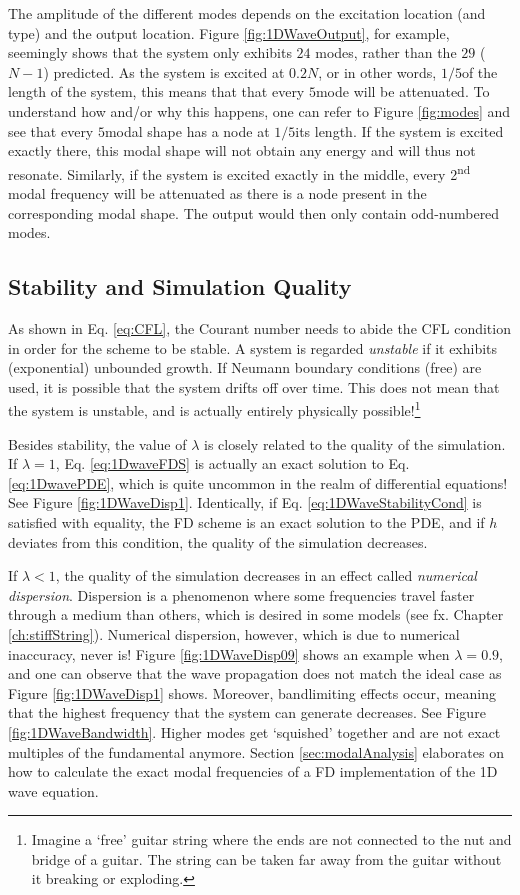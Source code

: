 The amplitude of the different modes depends on the excitation location (and type) and the output location. 
Figure \ref{fig:1DWaveOutput}, for example, seemingly shows that the system only exhibits $24$ modes, rather than the $29$ ($N-1$) predicted. As the system is excited at $0.2N$, or in other words, $1/5$\th of the length of the system, this means that that every $5$\th mode will be attenuated.
To understand how and/or why this happens, one can refer to Figure \ref{fig:modes} and see that every $5$\th modal shape has a node at $1/5$\th its length. If the system is excited exactly there, this modal shape will not obtain any energy and will thus not resonate. Similarly, if the system is excited exactly in the middle, every 2\textsuperscript{nd} modal frequency will be attenuated as there is a node present in the corresponding modal shape. The output would then only contain odd-numbered modes. 

\subsection{Stability and Simulation Quality}\label{sec:quality1DWave}
As shown in Eq. \eqref{eq:CFL}, the Courant number needs to abide the CFL condition in order for the scheme to be stable. A system is regarded \textit{unstable} if it exhibits (exponential) unbounded growth. If Neumann boundary conditions (free) are used, it is possible that the system drifts off over time. This does not mean that the system is unstable, and is actually entirely physically possible!\footnote{Imagine a `free' guitar string where the ends are not connected to the nut and bridge of a guitar. The string can be taken far away from the guitar without it breaking or exploding.}

Besides stability, the value of $\lambda$ is closely related to the quality of the simulation. 
If $\lambda = 1$, Eq. \eqref{eq:1DwaveFDS} is actually an exact solution to Eq. \eqref{eq:1DwavePDE}, which is quite uncommon in the realm of differential equations! See Figure \ref{fig:1DWaveDisp1}. Identically, if Eq. \eqref{eq:1DWaveStabilityCond} is satisfied with equality, the FD scheme is an exact solution to the PDE, and if $h$ deviates from this condition, the quality of the simulation decreases. 

If $\lambda < 1$, the quality of the simulation decreases in an effect called \textit{numerical dispersion}. Dispersion is a phenomenon where some frequencies travel faster through a medium than others, which is desired in some models (see fx. Chapter \ref{ch:stiffString}). Numerical dispersion, however, which is due to numerical inaccuracy, never is! Figure \ref{fig:1DWaveDisp09} shows an example when $\lambda = 0.9$, and one can observe that the wave propagation does not match the ideal case as Figure \ref{fig:1DWaveDisp1} shows. Moreover, bandlimiting effects occur, meaning that the highest frequency that the system can generate decreases. See Figure \ref{fig:1DWaveBandwidth}. Higher modes get `squished' together and are not exact multiples of the fundamental anymore. Section \ref{sec:modalAnalysis} elaborates on how to calculate the exact modal frequencies of a FD implementation of the 1D wave equation.

